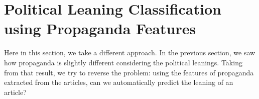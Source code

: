 










\section{\statusgreen Political Leaning Classification using Propaganda Features}
\label{ssec:ps_prop_leaning_classifier}

Here in this section, we take a different approach.
In the previous section, we saw how propaganda is slightly different considering the political leanings.
Taking from that result, we try to reverse the problem: using the features of propaganda extracted from the articles, can we automatically predict the leaning of an article?

